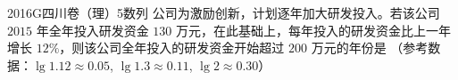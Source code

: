 
\begin{problem}{2016}{G}{四川卷（理）}{5}{数列}
公司为激励创新，计划逐年加大研发投入。若该公司 $ 2015 $ 年全年投入研发资金 $ 130 $ 万元，在此基础上，每年投入的研发资金比上一年增长 $ 12\% $，则该公司全年投入的研发资金开始超过 $ 200 $ 万元的年份是
（参考数据：$ \lg 1.12\approx 0.05 $, $ \lg 1.3\approx 0.11 $, $ \lg 2\approx 0.30 $）
\begin{choices}
\end{choices}
\end{problem}

\begin{answer}

\end{answer}

\begin{solutions}

\end{solutions}